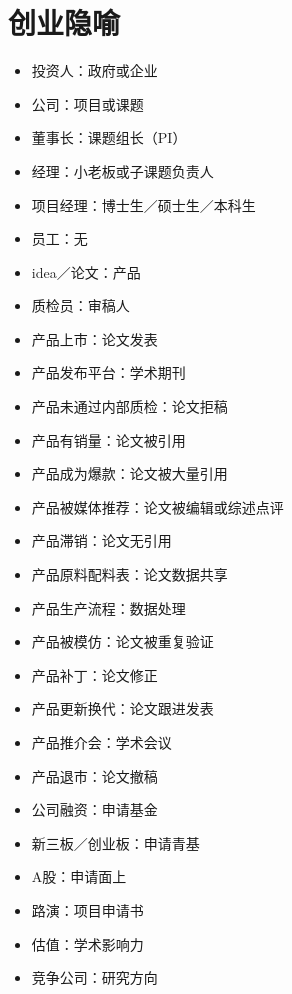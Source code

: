 \documentclass[]{tufte-book}
\providecommand{\tightlist}{%
  \setlength{\itemsep}{0pt}\setlength{\parskip}{0pt}}
\begin{document}
\hypertarget{ux521bux4e1aux9690ux55bb}{%
\section*{创业隐喻}\label{ux521bux4e1aux9690ux55bb}}

\begin{itemize}
\tightlist
\item
  投资人：政府或企业
\item
  公司：项目或课题
\item
  董事长：课题组长（PI）
\item
  经理：小老板或子课题负责人
\item
  项目经理：博士生／硕士生／本科生
\item
  员工：无
\item
  idea／论文：产品
\item
  质检员：审稿人
\item
  产品上市：论文发表
\item
  产品发布平台：学术期刊
\item
  产品未通过内部质检：论文拒稿
\item
  产品有销量：论文被引用
\item
  产品成为爆款：论文被大量引用
\item
  产品被媒体推荐：论文被编辑或综述点评
\item
  产品滞销：论文无引用
\item
  产品原料配料表：论文数据共享
\item
  产品生产流程：数据处理
\item
  产品被模仿：论文被重复验证
\item
  产品补丁：论文修正
\item
  产品更新换代：论文跟进发表
\item
  产品推介会：学术会议
\item
  产品退市：论文撤稿
\item
  公司融资：申请基金
\item
  新三板／创业板：申请青基
\item
  A股：申请面上
\item
  路演：项目申请书
\item
  估值：学术影响力
\item
  竞争公司：研究方向
\end{itemize}
\end{document}
